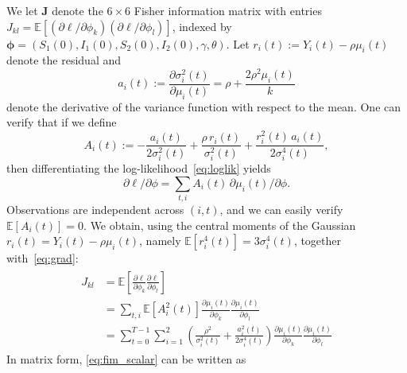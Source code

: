 \documentclass[11pt]{article}
\begin{document}
We let $\mathbf{J}$ denote the $6 \times 6$ Fisher information matrix with
entries $J_{kl} =
\mathbb{E}[(\partial\ell/\partial\phi_k)(\partial\ell/\partial\phi_l)]$,
indexed by $\boldsymbol{\phi} = (S_1(0), I_1(0), S_2(0), I_2(0),
\gamma, \theta)$.  Let $r_i(t) := Y_i(t) - \rho\mu_i(t)$ denote the
residual and
%
%
\begin{equation*}
a_i(t) := \frac{\partial \sigma_i^2(t)}{\partial \mu_i(t)} = \rho + \frac{2\rho^2 \mu_i(t)}{k}
\end{equation*}
%
%
denote the derivative of the variance function with respect to the
mean. One can verify that if we define
\begin{equation*}
A_i(t) := -\frac{a_i(t)}{2\sigma_i^2(t)} + \frac{\rho\, r_i(t)}{\sigma_i^2(t)}
+ \frac{r_i^2(t)\,a_i(t)}{2\sigma_i^4(t)},
\end{equation*}
then differentiating the log-likelihood~\eqref{eq:loglik} yields
%
%
\begin{equation}\label{eq:grad}
\partial \ell / \partial \phi = \sum_{t,i} A_i(t)\,\partial
\mu_i(t)/\partial \phi.
\end{equation}
%
%
Observations are independent across $(i,t)$, and we can easily verify
$\mathbb{E}[A_i(t)] = 0$. We obtain, using the central moments of the
Gaussian $r_i(t) = Y_i(t) - \rho\mu_i(t)$, namely
$\mathbb{E}[r_i^4(t)] = 3\sigma_i^4(t)$, together with~\eqref{eq:grad}:
\begin{align}\label{eq:fim_scalar}
  \begin{split}
    J_{kl} &= \mathbb{E}\left [\frac{\partial \ell}{\partial \phi_k}\frac{\partial \ell}{\partial \phi_l}\right ] \\
    &=\sum_{t,i} \mathbb{E}[A_i^2(t)] \frac{\partial \mu_i(t)}{\partial \phi_k}  \frac{\partial \mu_i(t)}{\partial \phi_l} \\
    &= \sum_{t=0}^{T-1}\sum_{i=1}^{2}\left( \frac{\rho^2}{\sigma_i^2(t)} +
    \frac{a_i^2(t)}{2\sigma_i^4(t)}\right) \frac{\partial
      \mu_i(t)}{\partial \phi_k} \frac{\partial \mu_i(t)}{\partial
      \phi_l}
  \end{split}
\end{align}
%
%
In matrix form, \eqref{eq:fim_scalar} can be written as 
\end{document}
